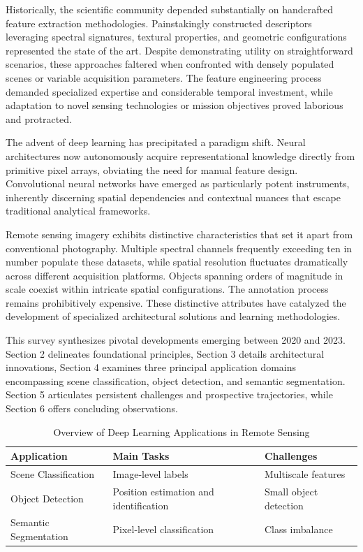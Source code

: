 \documentclass[12pt,a4paper]{article}
\begin{document}
Historically, the scientific community depended substantially on handcrafted feature extraction methodologies. Painstakingly constructed descriptors leveraging spectral signatures, textural properties, and geometric configurations represented the state of the art. Despite demonstrating utility on straightforward scenarios, these approaches faltered when confronted with densely populated scenes or variable acquisition parameters. The feature engineering process demanded specialized expertise and considerable temporal investment, while adaptation to novel sensing technologies or mission objectives proved laborious and protracted.

The advent of deep learning has precipitated a paradigm shift. Neural architectures now autonomously acquire representational knowledge directly from primitive pixel arrays, obviating the need for manual feature design. Convolutional neural networks have emerged as particularly potent instruments, inherently discerning spatial dependencies and contextual nuances that escape traditional analytical frameworks.

Remote sensing imagery exhibits distinctive characteristics that set it apart from conventional photography. Multiple spectral channels frequently exceeding ten in number populate these datasets, while spatial resolution fluctuates dramatically across different acquisition platforms. Objects spanning orders of magnitude in scale coexist within intricate spatial configurations. The annotation process remains prohibitively expensive. These distinctive attributes have catalyzed the development of specialized architectural solutions and learning methodologies.

This survey synthesizes pivotal developments emerging between 2020 and 2023. Section 2 delineates foundational principles, Section 3 details architectural innovations, Section 4 examines three principal application domains encompassing scene classification, object detection, and semantic segmentation. Section 5 articulates persistent challenges and prospective trajectories, while Section 6 offers concluding observations.

\begin{table}[htbp]
\centering
\caption{Overview of Deep Learning Applications in Remote Sensing}
\label{tab:applications}
\begin{tabular}{@{}lll@{}}
\toprule
\textbf{Application} & \textbf{Main Tasks} & \textbf{Challenges} \\
\midrule
Scene Classification & Image-level labels & Multiscale features \\
Object Detection & Position estimation and identification & Small object detection \\
Semantic Segmentation & Pixel-level classification & Class imbalance \\
\bottomrule
\end{tabular}
\end{table}
\end{document}
